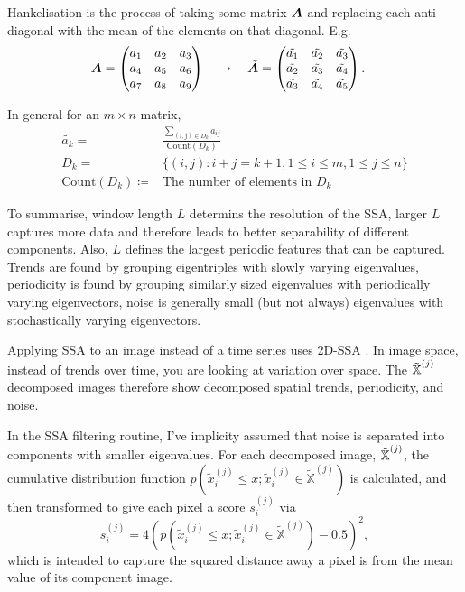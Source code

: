 \begin{aside}
	Hankelisation is the process of taking some matrix $\bm{A}$ and replacing each anti-diagonal with the mean of the elements on that diagonal. E.g.
	\begin{align*}
		\bm{A} = \begin{pmatrix}
			a_1 & a_2 & a_3 \\
			a_4 & a_5 & a_6 \\
			a_7 & a_8 & a_9 
		\end{pmatrix} 
		\quad \rightarrow \quad	
		\tilde{\bm{A}} &= \begin{pmatrix}
			\tilde{a_1} & \tilde{a_2} & \tilde{a_3} \\
			\tilde{a_2} & \tilde{a_3} & \tilde{a_4} \\
			\tilde{a_3} & \tilde{a_4} & \tilde{a_5}
		\end{pmatrix}.
	\end{align*}


	In general for an $m \times n$ matrix,
	\begin{align*}
		\tilde{a_k} =& \frac{ \sum\limits_{(i,j) \in D_k} a_{ij} }{\textrm{Count}(D_k)} \\
		D_k =& \lbrace (i,j) : i+j = k+1, 1 \leq i \leq m, 1 \leq j \leq n \rbrace \\
		\textrm{Count}(D_k) \coloneqq & \textrm{The number of elements in $D_k$}
	\end{align*}
\end{aside}

To summarise, window length $L$ determins the resolution of the SSA, larger $L$ captures more data and therefore leads to better separability of different components. Also, $L$ defines the largest periodic features that can be captured. Trends are found by grouping eigentriples with slowly varying eigenvalues, periodicity is found by grouping similarly sized eigenvalues with periodically varying eigenvectors, noise is generally small (but not always) eigenvalues with stochastically varying eigenvectors.

Applying SSA to an image instead of a time series uses 2D-SSA \cite{Golyandina13}. In image space, instead of trends over time, you are looking at variation over space. The $\tilde{\bm{\mathbb{X}}}^{(j)}$ decomposed images therefore show decomposed spatial trends, periodicity, and noise.

In the SSA filtering routine, I've implicity assumed that noise is separated into components with smaller eigenvalues. For each decomposed image, $\tilde{\bm{\mathbb{X}}}^{(j)}$, the cumulative distribution function $p(\tilde{x}_i^{(j)} \leq x; \tilde{x}_i^{(j)} \in \tilde{\mathbb{X}}^{(j)}) $ is calculated, and then transformed to give each pixel a score $s_i^{(j)}$ via
\[
	s_i^{(j)} = 4(p(\tilde{x}_i^{(j)} \leq x; \tilde{x}_i^{(j)} \in \tilde{\mathbb{X}}^{(j)}) - 0.5)^2,
\]
which is intended to capture the squared distance away a pixel is from the mean value of its component image.

